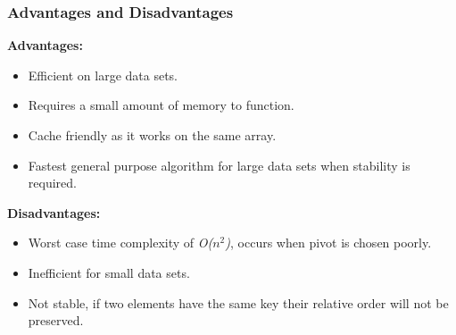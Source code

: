 \subsubsection*{Advantages and Disadvantages}

\textbf{Advantages:}

\begin{itemize}
  \item Efficient on large data sets.
  \item Requires a small amount of memory to function.
  \item Cache friendly as it works on the same array.
  \item Fastest general purpose algorithm for large data sets when stability is required.
\end{itemize}

\textbf{Disadvantages:}

\begin{itemize}
  \item Worst case time complexity of \textit{O($n^2$)}, occurs when pivot is chosen poorly.
  \item Inefficient for small data sets.
  \item Not stable, if two elements have the same key their relative order will not be preserved.
\end{itemize}

